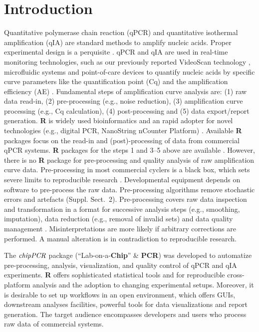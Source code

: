 \documentclass{bioinfo}
\begin{document}
\section{Introduction}

Quantitative polymerase chain reaction (qPCR) and quantitative isothermal 
amplification (qIA) are standard methods to amplify nucleic acids. Proper 
experimental design is a perquisite \citep{cobb_1994}. qPCR and qIA are used in 
real-time monitoring technologies, such as our previously reported VideoScan 
technology \citep{roediger_highly_2013,spiess_impact_2014}, microfluidic systems and point-of-care 
devices to quantify nucleic acids by specific curve parameters like the 
quantification point (Cq) and the amplification efficiency (AE) 
\citep{pabinger_2014,rodiger_nucleic_2014}. Fundamental steps of amplification 
curve analysis are: (1) raw data read-in, (2) pre-processing (e.g., noise 
reduction), (3) amplification curve processing 
(e.g., Cq calculation), (4) post-processing and (5) data 
export/report generation. \textbf{R} is widely used bioinformatics 
and an rapid adopter for novel technologies (e.g., digital PCR, 
NanoString nCounter Platform) \citep{waggott_2012,pabinger_2014}. 
Available \textbf{R} packages focus on the read-in and (post)-processing of data 
from commercial qPCR systems. \textbf{R} packages for the steps 1 and 3--5 above 
are available \citep{perkins_2012,gehlenborg_2013,mccall_2014,pabinger_2014}. 
However, there is no \textbf{R} package for pre-processing and quality analysis 
of raw amplification curve data. Pre-processing in most commercial cyclers is a 
black box, which sets severe limits to reproducible research 
\citep{Leeper_2014}. Developmental equipment depends on software to 
pre-process the raw data. Pre-processing algorithms remove stochastic errors and 
artefacts (Suppl. Sect.~2). Pre-processing covers raw data inspection and 
transformation in a format for successive analysis steps (e.g., smoothing, 
imputation), data reduction (e.g., removal of invalid sets) and data quality 
management \citep{spiess_impact_2014}. Misinterpretations are more likely if 
arbitrary corrections are performed. A manual alteration is in contradiction to 
reproducible research.

The $\emph{chipPCR}$ package (``Lab-on-a-\textbf{Chip}'' \& \textbf{PCR}) was 
developed to automatize pre-processing, analysis, visualization, and quality 
control of qPCR and qIA experiments. \textbf{R} offers sophisticated statistical 
tools and for reproducible cross-platform analysis and the adoption to changing 
experimental setups. Moreover, it is desirable to set up workflows in an open 
environment, which offers GUIs, downstream analyses facilities, powerful tools 
for data visualizations and report generation. The target audience encompasses 
developers and users who process raw data of commercial systems.
\end{document}
